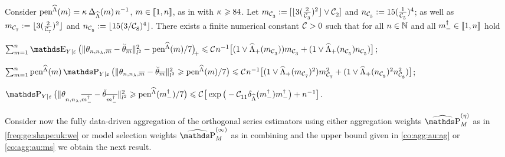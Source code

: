 \begin{lm}\label{au:re:nd:rest}
Consider $\mathop{\mathrm{pen}}\nolimits^{\widehat{\Lambda}} (m)=\kappa_{}\,\Delta_{\widehat{\Lambda}}(m)\,n^{-1}$,
  $m\in{\llbracket 1,n \rrbracket }$, as in  with $\kappa_{}\geqslant84$.
Let $m_{{\mathcal C}^{}_{3}}:=[\lfloor 3(\tfrac{2}{{\mathcal C}^{}_{3}})^2\rfloor\vee {\mathcal C}^{}_{2}]$ and $n_{{\mathcal C}^{}_{5}}:=15(\tfrac{1}{{\mathcal C}^{}_{5}})^4$; as well as $m_{{\mathcal C}^{}_{7}}:=\lfloor 3(\tfrac{2}{{\mathcal C}^{}_{7}})^2\rfloor$ and
    $n_{{\mathcal C}^{}_{8}}:=\lfloor 15({3/{\mathcal C}^{}_{8}})^4\rfloor$.
    There exists a finite numerical constant  ${\mathcal C}^{}_{}>0$ such that for all $n\in{\mathbb N}$ and all $m^\dagger_{-}\in{\llbracket 1,n\rrbracket }$  hold
\begin{resListeN}
\item\label{au:re:nd:rest1}
$\sum_{\Di=1}^{\ssY}\E_{\rY \vert \rE}\vectp{\Vnormlp{\hxdfPr-\dxdfPr}^2-\peneSv/7}\\
\leq\cst{}\ssY^{-1}\big[(1\vee\meiSv[\Di_{\cst{3}}])\Di_{\cst{3}}+(1\vee\meiSv[\ssY_{\cst{5}}]\ssY_{\cst{5}})\big]$;
\item\label{au:re:nd:rest2}
  $\sum_{\Di=1}^{\ssY}\peneSv\P_{\rY \vert \rE}\big(\Vnormlp{\hxdfPr-\dxdfPr}^2\geq\peneSv/7\big)\leq\cst{}\ssY^{-1}\big[(1\vee\meiSv[\Di_{\cst{7}}]^2)\Di_{\cst{7}}^2+(1\vee\meiSv[\ssY_{\cst{8}}]^2\ssY_{\cst{8}}^2)\big]$;
\item\label{au:re:nd:rest3}
  $\P_{\rY \vert \rE}\big(\Vnormlp{\hxdfPr[\mdDi]-\dxdfPr[\mdDi]}^2\geq\peneSv[(\mdDi)]/7\big)\leq    \cst{}  \big[\exp\big(-\cst{11}\cmeiSv[\mdDi]\mdDi\big)
    +\ssY^{-1}\big]$.
\end{resListeN}
\reEnd
\end{lm}
\begin{te}Consider now the fully data-driven aggregation of the
  orthogonal series estimators using either  aggregation weights $\erWe[]$
  as in \eqref{freq:ge:shape:uk:we} or model selection weights $\widehat{\P}_{M}^{(\infty)}$ as in 
  combining  and the upper bound given
  in \eqref{co:agg:au:ag}  or \eqref{co:agg:au:ms} we obtain the next result. 
\end{te}
